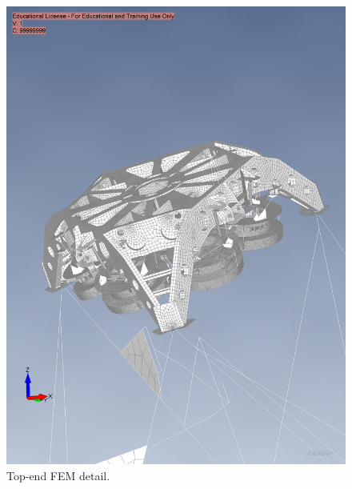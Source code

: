 \begin{figure}
  \centering
  \includegraphics[width=\textwidth]{FEM/topend.png}
  \caption{Top-end FEM detail.}
  \label{fig:fem-topend}
\end{figure}

